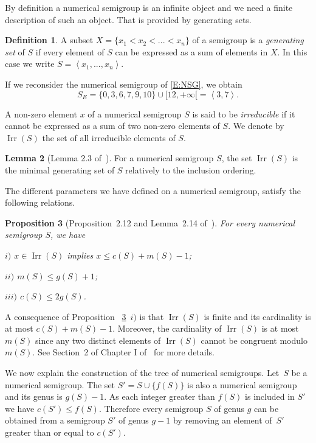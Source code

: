 \documentclass[reqno]{amsart}
\theoremstyle{plain}
\newtheorem{prop}{Proposition}[section]
\theoremstyle{definition}
\newtheorem{defi}[prop]{Definition}
\newtheorem{lem}[prop]{Lemma}
\renewcommand{\leq}{\leqslant}
\DeclareMathOperator{\Irr}{Irr}
\begin{document}
By definition a numerical semigroup is an infinite object and we need a finite description of such an object. 
That is provided by generating sets.


\begin{defi}
A subset $X=\{x_1<x_2<...<x_n\}$ of a semigroup is a \emph{generating set} of $S$ if every element of $S$ can be expressed as a sum of elements in $X$. 
In this case we write $S=\left<x_1,...,x_n\right>$.
\end{defi}

If we reconsider the numerical semigroup of \eqref{E:NSG}, we obtain
\begin{equation}
\label{E:GNSG}
S_E=\{0,3,6,7,9,10\}\cup[12,+\infty[=\left<3,7\right>.
\end{equation}


A non-zero element $x$ of a numerical semigroup $S$ is said to be \emph{irreducible} if it cannot be expressed as a sum of two non-zero elements of $S$.  
We denote by $\Irr(S)$ the set of all irreducible elements of $S$.

\begin{lem}[Lemma 2.3 of~\cite{BookNS}]
For a numerical semigroup $S$, the set $\Irr(S)$ is the minimal generating set of $S$ relatively to the inclusion ordering.
\end{lem} 


The different parameters we have defined on a numerical semigroup, satisfy the following relations.

\begin{prop}[Proposition~2.12 and Lemma~2.14 of~\cite{BookNS}]
\label{P:Res}
For every  numerical semigroup  $S$,  we have

$i)$  $x\in \Irr(S)$ implies $x\leq c(S)+m(S)-1$;

$ii)$ $m(S)\leq g(S)+1$;

$iii)$ $c(S)\leq 2 g(S)$.
\end{prop}


A consequence of Proposition~ \ref{P:Res}~$i)$ is that $\Irr(S)$ is finite and its cardinality is at most $c(S)+m(S)-1$.
Moreover, the cardinality of $\Irr(S)$ is at most $m(S)$ since any two distinct elements of $\Irr(S)$ cannot be congruent modulo $m(S)$. See Section~2 of Chapter I of~\cite{BookNS} for more details.

We now explain the construction of the tree of numerical semigroups.
Let~$S$ be a numerical semigroup. The set $S'=S\cup\{f(S)\}$ is also a numerical  semigroup and its genus is $g(S)-1$. 
As  each integer greater than $f(S)$ is included in $S'$ we have $c(S')\leq f(S)$. 
Therefore every semigroup $S$ of genus $g$ can be obtained from a semigroup $S'$ of genus $g-1$ by removing an element of~$S'$ greater than or equal to $c(S')$.
\end{document}

